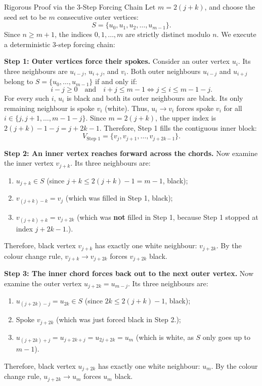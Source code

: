 \documentclass[11pt]{article}
\begin{document}
\begin{defbox}{Rigorous Proof via the 3-Step Forcing Chain}
Let $m = 2(j+k)$, and choose the seed set to be $m$ consecutive outer vertices:
\begin{equation}
  S = \{ u_0, u_1, u_2, \dots, u_{m-1} \}.
\end{equation}
Since $n \ge m + 1$, the indices $0, 1, \dots, m$ are strictly distinct modulo $n$.
We execute a deterministic 3-step forcing chain:

\noindent\textbf{Step 1: Outer vertices force their spokes.}
Consider an outer vertex $u_i$. Its three neighbours are $u_{i-j}$, $u_{i+j}$, and $v_i$.
Both outer neighbours $u_{i-j}$ and $u_{i+j}$ belong to $S = \{u_0, \dots, u_{m-1}\}$ if and only if:
\begin{equation}
  i - j \ge 0 \quad \text{and} \quad i + j \le m - 1 \iff j \le i \le m - 1 - j.
\end{equation}
For every such $i$, $u_i$ is black and both its outer neighbours are black. Its only remaining neighbour is spoke $v_i$ (white).
Thus, $u_i \to v_i$ forces spoke $v_i$ for all $i \in \{j, j+1, \dots, m - 1 - j\}$.
Since $m = 2(j+k)$, the upper index is $2(j+k) - 1 - j = j + 2k - 1$.
Therefore, Step 1 fills the contiguous inner block:
\begin{equation}
  V_{\text{Step 1}} = \{ v_j, v_{j+1}, \dots, v_{j+2k-1} \}.
\end{equation}

\noindent\textbf{Step 2: An inner vertex reaches forward across the chords.}
Now examine the inner vertex $v_{j+k}$. Its three neighbours are:
\begin{enumerate}[leftmargin=*,nosep]
  \item $u_{j+k} \in S$ (since $j+k \le 2(j+k)-1 = m-1$, black);
  \item $v_{(j+k)-k} = v_j$ (which was filled in Step 1, black);
  \item $v_{(j+k)+k} = v_{j+2k}$ (which was \textbf{not} filled in Step 1, because Step 1 stopped at index $j+2k-1$.).
\end{enumerate}
Therefore, black vertex $v_{j+k}$ has exactly one white neighbour: $v_{j+2k}$.
By the colour change rule, $v_{j+k} \to v_{j+2k}$ forces $v_{j+2k}$ black.

\noindent\textbf{Step 3: The inner chord forces back out to the next outer vertex.}
Now examine the outer vertex $u_{j+2k} = u_{m-j}$. Its three neighbours are:
\begin{enumerate}[leftmargin=*,nosep]
  \item $u_{(j+2k)-j} = u_{2k} \in S$ (since $2k \le 2(j+k)-1$, black);
  \item Spoke $v_{j+2k}$ (which was just forced black in Step 2.);
  \item $u_{(j+2k)+j} = u_{j+2k+j} = u_{2j+2k} = u_m$ (which is white, as $S$ only goes up to $m-1$).
\end{enumerate}
Therefore, black vertex $u_{j+2k}$ has exactly one white neighbour: $u_m$.
By the colour change rule, $u_{j+2k} \to u_m$ forces $u_m$ black.


\end{defbox}
\end{document}
